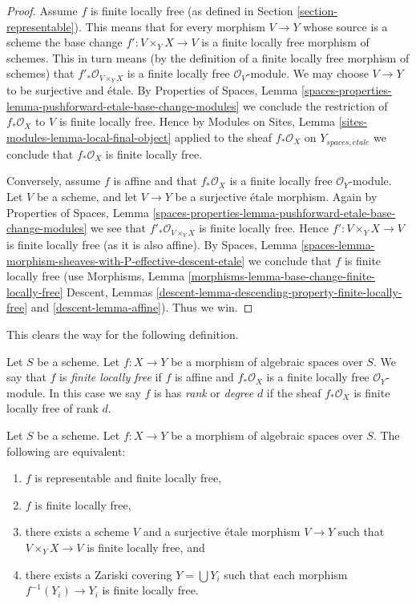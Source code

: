 \begin{proof}
Assume $f$ is finite locally free (as defined in
Section \ref{section-representable}). This means that
for every morphism $V \to Y$ whose source is a scheme the
base change $f' : V \times_Y X \to V$ is a finite locally free morphism
of schemes. This in turn means (by the definition of a finite locally
free morphism of schemes) that
$f'_*\mathcal{O}_{V \times_Y X}$
is a finite locally free $\mathcal{O}_V$-module. We may choose $V \to Y$
to be surjective and \'etale. By
Properties of Spaces,
Lemma \ref{spaces-properties-lemma-pushforward-etale-base-change-modules}
we conclude the restriction of $f_*\mathcal{O}_X$ to $V$ is
finite locally free. Hence by
Modules on Sites, Lemma \ref{sites-modules-lemma-local-final-object}
applied to the sheaf $f_*\mathcal{O}_X$ on $Y_{spaces, \acute{e}tale}$
we conclude that $f_*\mathcal{O}_X$ is finite locally free.

\medskip\noindent
Conversely, assume $f$ is affine and that $f_*\mathcal{O}_X$ is a finite
locally free $\mathcal{O}_Y$-module. Let $V$ be a scheme, and let
$V \to Y$ be a surjective \'etale morphism. Again by
Properties of Spaces,
Lemma \ref{spaces-properties-lemma-pushforward-etale-base-change-modules}
we see that $f'_*\mathcal{O}_{V \times_Y X}$ is finite locally free.
Hence $f' : V \times_Y X \to V$ is finite locally free (as it is also affine).
By
Spaces,
Lemma \ref{spaces-lemma-morphism-sheaves-with-P-effective-descent-etale}
we conclude that $f$ is finite locally free (use
Morphisms, Lemma \ref{morphisms-lemma-base-change-finite-locally-free}
Descent, Lemmas \ref{descent-lemma-descending-property-finite-locally-free}
and \ref{descent-lemma-affine}). Thus we win.
\end{proof}

\noindent
This clears the way for the following definition.

\begin{definition}
\label{definition-finite-locally-free}
Let $S$ be a scheme.
Let $f : X \to Y$ be a morphism of algebraic spaces over $S$.
We say that $f$ is {\it finite locally free} if $f$ is affine
and $f_*\mathcal{O}_X$ is a finite locally free $\mathcal{O}_Y$-module.
In this case we say $f$ is
has {\it rank} or {\it degree} $d$
if the sheaf $f_*\mathcal{O}_X$ is finite locally free of rank $d$.
\end{definition}

\begin{lemma}
\label{lemma-finite-locally-free-local}
Let $S$ be a scheme.
Let $f : X \to Y$ be a morphism of algebraic spaces over $S$.
The following are equivalent:
\begin{enumerate}
\item $f$ is representable and finite locally free,
\item $f$ is finite locally free,
\item there exists a scheme $V$ and a surjective \'etale morphism
$V \to Y$ such that $V \times_Y X \to V$ is finite locally free, and
\item there exists a Zariski covering $Y = \bigcup Y_i$ such that
each morphism $f^{-1}(Y_i) \to Y_i$ is finite locally free.
\end{enumerate}
\end{lemma}

